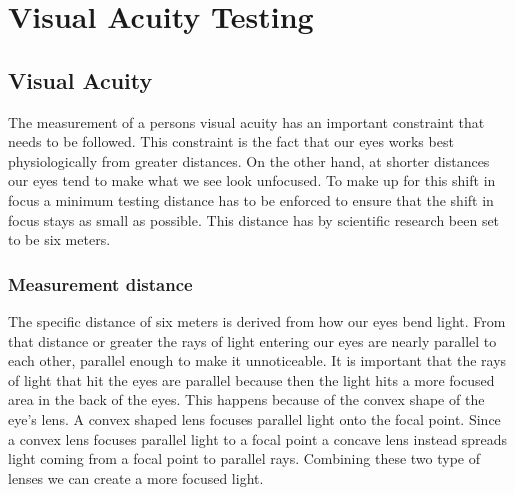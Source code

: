 \documentclass[12pt,a4paper,notitlepage]{report}
\begin{document}
%

\chapter{ Visual Acuity Testing}
\section{Visual Acuity}
The measurement of a persons visual acuity has an important constraint that needs to be followed. This constraint is the fact that our eyes works best physiologically from greater distances. On the other hand, at shorter distances our eyes tend to make what we see look unfocused. To make up for this shift in focus a minimum testing distance has to be enforced to ensure that the shift in focus stays as small as possible. This distance has by scientific research been set to be six meters.

\subsection{Measurement distance}
The specific distance of six meters is derived from how our eyes bend light. From that distance or greater the rays of light entering our eyes are nearly parallel to each other, parallel enough to make it unnoticeable. It is important that the rays of light that hit the eyes are parallel because then the light hits a more focused area in the back of the eyes. This happens because of the convex shape of the eye's lens. A convex shaped lens focuses parallel light onto the focal point. Since a convex lens focuses parallel light to a focal point a concave lens instead spreads light coming from a focal point to parallel rays. Combining these two type of lenses we can create a more focused light. 
\end{document}
